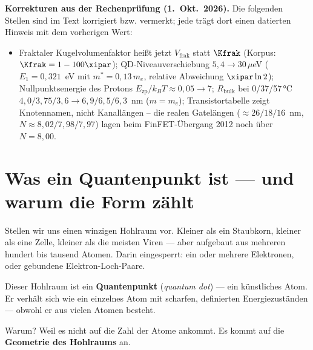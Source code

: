 
\begin{tcolorbox}[colback=red!3!white,colframe=red!50!black,boxrule=0.8pt,title={Korrekturhinweise},fonttitle=\bfseries]
\textbf{Korrekturen aus der Rechenprüfung (1.~Okt.~2026).} Die folgenden Stellen sind im Text korrigiert bzw. vermerkt; jede trägt dort einen datierten Hinweis mit dem vorherigen Wert:
\begin{itemize}
\item Fraktaler Kugelvolumenfaktor heißt jetzt $V_{\text{frak}}$ statt $\Kfrak$ (Korpus: $\Kfrak = 1 - 100\xipar$); QD-Niveauverschiebung $5{,}4 \to 30\,\mu$eV ($E_1 = 0{,}321$~eV mit $m^* = 0{,}13\,m_e$, relative Abweichung $\xipar\ln 2$); Nullpunktsenergie des Protons $E_\text{zp}/k_BT \approx 0{,}05 \to 7$; $R_{\text{bulk}}$ bei 0/37/57\,°C $4{,}0/3{,}75/3{,}6 \to 6{,}9/6{,}5/6{,}3$~nm ($m = m_e$); Transistortabelle zeigt Knotennamen, nicht Kanallängen -- die realen Gatelängen ($\approx 26/18/16$~nm, $N \approx 8{,}02/7{,}98/7{,}97$) lagen beim FinFET-Übergang 2012 noch über $N = 8{,}00$.
\end{itemize}
\end{tcolorbox}

\section{Was ein Quantenpunkt ist --- und warum die Form zählt}

Stellen wir uns einen winzigen Hohlraum vor. Kleiner als ein Staubkorn,
kleiner als eine Zelle, kleiner als die meisten Viren --- aber aufgebaut
aus mehreren hundert bis tausend Atomen. Darin eingesperrt:
ein oder mehrere Elektronen, oder gebundene Elektron-Loch-Paare.

Dieser Hohlraum ist ein \textbf{Quantenpunkt} (\textit{quantum dot}) ---
ein künstliches Atom. Er verhält sich wie ein einzelnes Atom mit
scharfen, definierten Energiezuständen --- obwohl er aus vielen
Atomen besteht.

Warum? Weil es nicht auf die Zahl der Atome ankommt.
Es kommt auf die \textbf{Geometrie des Hohlraums} an.

